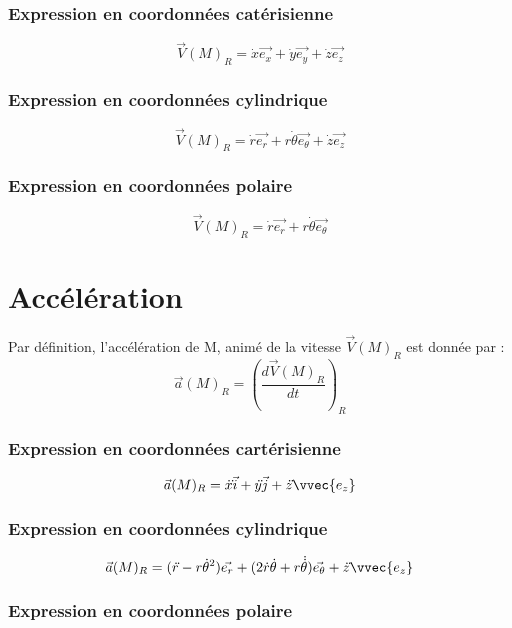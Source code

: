 \subsubsection{Expression en coordonnées catérisienne}

$$\vec{V}(M)_R = \dot{x}\vec{e_x} + \dot{y}\vec{e_y} + \dot{z} \vec{e_z}$$

\subsubsection{Expression en coordonnées cylindrique}

$$\vec{V}(M)_R = \dot{r}\vec{e_r} + r\dot{\theta}\vec{e_{\theta}} + \dot{z} \vec{e_z}$$

\subsubsection{Expression en coordonnées polaire}

$$\vec{V}(M)_R = \dot{r}\vec{e_r} + r\dot{\theta}\vec{e_{\theta}}$$

\section{Accélération}

\begin{de}
Par définition, l'accélération de M, animé de la vitesse $\vec{V}(M)_R$ est donnée par :
$$\vec{a}(M)_R = \left( \dfrac{d\vec{V}(M)_R}{dt}\right)_R $$
\end{de}

\subsubsection{Expression en coordonnées cartérisienne}

$$\vec{a}(M)_R = \dot{x}\dot{}\vec{i} + \dot{y}\dot{}\vec{j} + \dot{z}\dot{} \vvec{e_z}$$

\subsubsection{Expression en coordonnées cylindrique}

$$\vec{a}(M)_R = (\dot{r}\dot{} - r\dot{\theta}^2)\vec{e_r} + (2\dot{r}\dot{\theta} + r\dot{\dot{\theta}})\vec{e_{\theta}} + \dot{z}\dot{}\vvec{e_z}$$

\subsubsection{Expression en coordonnées polaire}

